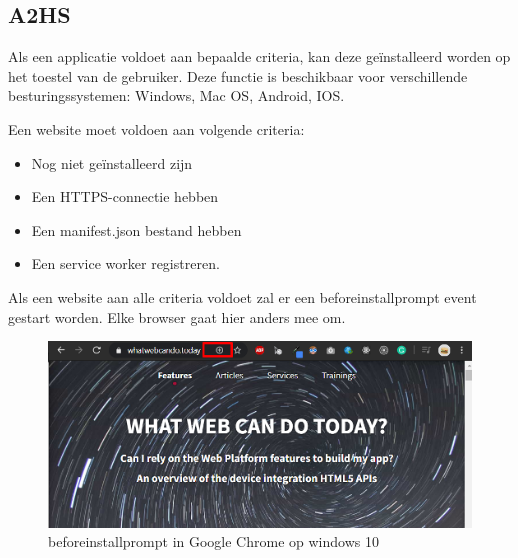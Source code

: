 \subsection{A2HS}

	
	Als een applicatie voldoet aan bepaalde criteria, kan deze geïnstalleerd worden op het toestel van de gebruiker. Deze functie is beschikbaar voor verschillende besturingssystemen: Windows, Mac OS, Android, IOS.
	
	Een website moet voldoen aan volgende criteria:
	
	\begin{itemize}
		\item	Nog niet geïnstalleerd zijn
		\item	Een HTTPS-connectie hebben
		\item	Een manifest.json bestand hebben
		\item	Een service worker registreren.
	\end{itemize}
	
	Als een website aan alle criteria voldoet zal er een beforeinstallprompt event gestart worden. Elke browser gaat hier anders mee om. 
	
	\begin{figure}[H]
		\centering
		\includegraphics{./img/beforeinstallprompt_windows.png}	
		\caption{beforeinstallprompt in Google Chrome op windows 10}
	\end{figure}
	
